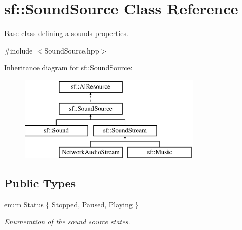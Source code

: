 \hypertarget{classsf_1_1_sound_source}{}\section{sf\+:\+:Sound\+Source Class Reference}
\label{classsf_1_1_sound_source}


Base class defining a sound\textquotesingle{}s properties.  




{\ttfamily \#include $<$Sound\+Source.\+hpp$>$}

Inheritance diagram for sf\+:\+:Sound\+Source\+:\begin{figure}[H]
\begin{center}
\leavevmode
\includegraphics[height=4.000000cm]{classsf_1_1_sound_source}
\end{center}
\end{figure}
\subsection*{Public Types}
\begin{DoxyCompactItemize}
\item 
enum \hyperlink{classsf_1_1_sound_source_ac43af72c98c077500b239bc75b812f03}{Status} \{ \hyperlink{classsf_1_1_sound_source_ac43af72c98c077500b239bc75b812f03adabb01e8aa85b2f54b344890addf764a}{Stopped}, 
\hyperlink{classsf_1_1_sound_source_ac43af72c98c077500b239bc75b812f03ac3ca1fcc0394267c9bdbe3dc0a8a7e41}{Paused}, 
\hyperlink{classsf_1_1_sound_source_ac43af72c98c077500b239bc75b812f03af07bdea9f70ef7606dfc9f955beeee18}{Playing}
 \}\begin{DoxyCompactList}\small\item\em Enumeration of the sound source states. \end{DoxyCompactList}
\end{DoxyCompactItemize}
